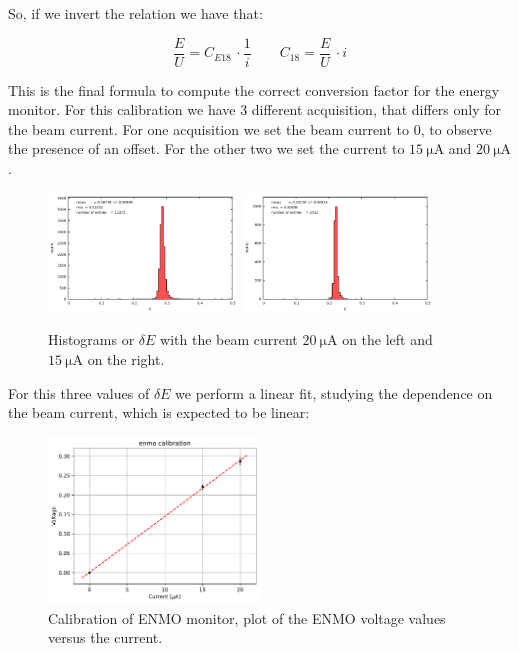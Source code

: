 So, if we invert the relation we have that:

\begin{equation}
\frac{E}{U} = C_{E18} \, \cdot \frac{1}{i} \qquad  C_{18} = \frac{E}{U} \, \cdot i
\end{equation}  

This is the final formula to compute the correct conversion factor for the energy monitor. 
For this calibration we have 3 different acquisition, that differs only for the beam current. For one acquisition we set the beam current to $0$, to observe the presence of an offset. For the other two we set the current to $\SI{15}{\micro \ampere}$ and $\SI{20}{\micro \ampere}$.

\begin{figure}[hbtp]
\centering
\includegraphics[width = 0.45\textwidth]{Analysis/ENMOvoltage20.pdf}
\includegraphics[width = 0.45\textwidth]{Analysis/ENMOvoltage15.pdf} 
\caption{Histograms or $\delta E$ with the beam current $\SI{20}{\micro \ampere}$ on the left and $\SI{15}{\micro \ampere}$ on the right.}
\end{figure}

For this three values of $\delta E$ we perform a linear fit, studying the dependence on the beam current, which is expected to be linear:

\begin{figure}[hbtp]
\centering
\includegraphics[width = 0.5\textwidth]{Analysis/Calibrations/E18_Calibration.pdf}
\caption{Calibration of ENMO monitor, plot of the ENMO voltage values versus the current.}
\end{figure}

